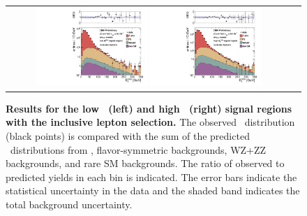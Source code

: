 \begin{figure}[!h]
\begin{center}
\begin{tabular}{cc}
\includegraphics[width=0.4\textwidth]{plots/edge_pfmet_pt40_lowMet_all.pdf}
\includegraphics[width=0.4\textwidth]{plots/edge_pfmet_pt40_highMet_all.pdf}
\end{tabular}
\caption{\footnotesize {\bf Results for the low \MET\ (left) and high \MET\ (right) signal regions with the inclusive lepton selection.}
The observed \MET\ distribution (black points) is compared with the sum of the predicted \MET\
distributions from \zjets, flavor-symmetric backgrounds, WZ+ZZ backgrounds, and rare SM backgrounds. 
The ratio of observed to predicted yields in each bin is
indicated. The error bars indicate the statistical uncertainty in the data and the shaded band indicates the total background uncertainty.
\label{fig:results_inclusive}
}
\end{center}
\end{figure}

